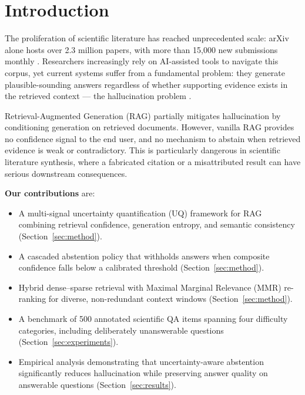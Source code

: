 \documentclass[conference]{IEEEtran}
\begin{document}
\section{Introduction}
\label{sec:intro}

The proliferation of scientific literature has reached unprecedented scale:
arXiv alone hosts over 2.3 million papers, with more than 15,000 new submissions
monthly \cite{arxiv2024}. Researchers increasingly rely on AI-assisted tools to
navigate this corpus, yet current systems suffer from a fundamental
problem: they generate plausible-sounding answers regardless of whether
supporting evidence exists in the retrieved context --- the hallucination problem
\cite{maynez2020faithfulness, ji2023survey}.

Retrieval-Augmented Generation (RAG) \cite{lewis2020rag} partially mitigates
hallucination by conditioning generation on retrieved documents. However, vanilla
RAG provides no confidence signal to the end user, and no mechanism to abstain
when retrieved evidence is weak or contradictory. This is particularly dangerous
in scientific literature synthesis, where a fabricated citation or a misattributed
result can have serious downstream consequences.

\textbf{Our contributions} are:
\begin{itemize}
    \item A multi-signal uncertainty quantification (UQ) framework for RAG
          combining retrieval confidence, generation entropy, and semantic
          consistency (Section~\ref{sec:method}).
    \item A cascaded abstention policy that withholds answers when composite
          confidence falls below a calibrated threshold (Section~\ref{sec:method}).
    \item Hybrid dense--sparse retrieval with Maximal Marginal Relevance
          (MMR) re-ranking for diverse, non-redundant context windows
          (Section~\ref{sec:method}).
    \item A benchmark of 500 annotated scientific QA items spanning four
          difficulty categories, including deliberately unanswerable questions
          (Section~\ref{sec:experiments}).
    \item Empirical analysis demonstrating that uncertainty-aware abstention
          significantly reduces hallucination while preserving answer quality
          on answerable questions (Section~\ref{sec:results}).
\end{itemize}
\end{document}
